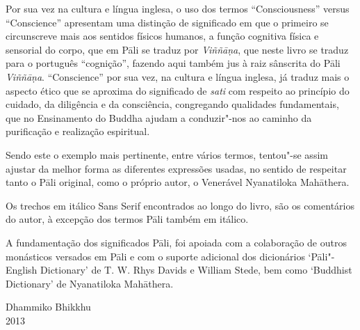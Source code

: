 Por sua vez na cultura e língua inglesa, o uso dos termos “Consciousness”
versus “Conscience” apresentam uma distinção de significado em que 
o primeiro se circunscreve mais aos sentidos físicos humanos, a
função cognitiva física e sensorial do corpo, que em Pāli se traduz por
\emph{Viññāṇa}, que neste livro se traduz para o português
“cognição”, fazendo aqui também jus à raiz sânscrita do Pāli \emph{Viññāṇa}.
“Conscience” por sua vez, na cultura e língua inglesa, já traduz mais o aspecto ético que se
aproxima do significado de \emph{sati} com respeito ao princípio do
cuidado, da diligência e da consciência, congregando
qualidades fundamentais, que no Ensinamento do Buddha ajudam a conduzir"-nos ao
caminho da purificação e realização espiritual.

Sendo este o exemplo mais pertinente, entre vários termos, tentou"-se assim ajustar da melhor
forma as diferentes expressões usadas, no sentido de respeitar tanto o Pāli
original, como o próprio autor, o Venerável Nyanatiloka Mahāthera.

Os trechos em itálico Sans Serif encontrados ao longo do livro, são os comentários
do autor, à excepção dos termos Pāli também em itálico.

A fundamentação dos significados Pāli, foi apoiada com a colaboração de outros
monásticos versados em Pāli e com o suporte adicional dos dicionários
‘Pāli"-English Dictionary’ de T. W. Rhys Davids e William Stede, bem como
‘Buddhist Dictionary’ de Nyanatiloka Mahāthera.

\bigskip

{\raggedleft
  Dhammiko Bhikkhu\\
  2013
\par}
